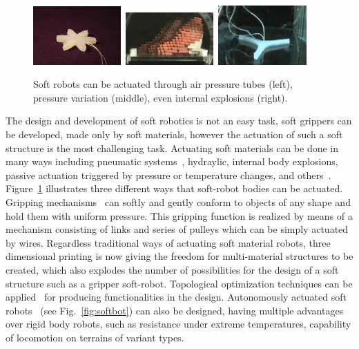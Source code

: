 \begin{figure}[t!]
\centering
\includegraphics[width=0.3\textwidth,height=0.13\textheight]{../Figures/Misc/soft_robotics_figure.png}\		
\includegraphics[width=0.3\textwidth,height=0.13\textheight]{../Figures/Misc/hillerPressureChamber.png}\	
\includegraphics[width=0.3\textwidth,height=0.13\textheight]{../Figures/Misc/ExplodingRobot.jpg}\\
\caption{Soft robots can be actuated through air pressure tubes (left), pressure variation (middle), even internal explosions (right).}
\label{fig:softRobotsActuation}
\end{figure}

The design and development of soft robotics is not an easy task, soft grippers can be developed, made only by soft materials, however the actuation of such a soft structure is the most challenging task. Actuating soft materials can be done in many ways including pneumatic systems~\citep{ilievski2011soft, shepherd2011multigait}, hydraylic, internal body explosions, passive actuation triggered by pressure or temperature changes, and others~\citep{laschi2012soft, seok2010peristaltic}. Figure~\ref{fig:softRobotsActuation} illustrates three different ways that soft-robot bodies can be actuated. Gripping mechanisms~\citep{hirose1978development} can softly and gently conform to objects of any shape and hold them with uniform pressure. This gripping function is realized by means of a mechanism consisting of links and series of pulleys which can be simply actuated by wires. Regardless traditional ways of actuating soft material robots, three dimensional printing is now giving the freedom for multi-material structures to be created, which also explodes the number of possibilities for the design of a soft structure such as a gripper soft-robot. Topological optimization techniques can be applied~\citep{hiller2009multi} for producing functionalities in the design. Autonomously actuated soft robots~\citep{tolleyresilient} (see Fig.~\ref{fig:softbot}) can also be designed, having multiple advantages over rigid body robots, such as resistance under extreme temperatures, capability of locomotion on terrains of variant types. 

